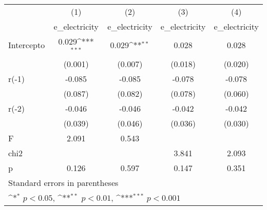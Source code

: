 {
\def\sym#1{\ifmmode^{#1}\else\(^{#1}\)\fi}
\begin{longtable}{l*{4}{c}}
\hline\hline\endfirsthead\hline\endhead\hline\endfoot\endlastfoot
            &\multicolumn{1}{c}{(1)}&\multicolumn{1}{c}{(2)}&\multicolumn{1}{c}{(3)}&\multicolumn{1}{c}{(4)}\\
            &\multicolumn{1}{c}{e\_electricity}&\multicolumn{1}{c}{e\_electricity}&\multicolumn{1}{c}{e\_electricity}&\multicolumn{1}{c}{e\_electricity}\\
\hline
Intercepto  &       0.029\sym{***}&       0.029\sym{**} &       0.028         &       0.028         \\
            &     (0.001)         &     (0.007)         &     (0.018)         &     (0.020)         \\
r(-1)       &      -0.085         &      -0.085         &      -0.078         &      -0.078         \\
            &     (0.087)         &     (0.082)         &     (0.078)         &     (0.060)         \\
r(-2)       &      -0.046         &      -0.046         &      -0.042         &      -0.042         \\
            &     (0.039)         &     (0.046)         &     (0.036)         &     (0.030)         \\
\hline
F           &       2.091         &       0.543         &                     &                     \\
chi2        &                     &                     &       3.841         &       2.093         \\
p           &       0.126         &       0.597         &       0.147         &       0.351         \\
\hline\hline
\multicolumn{5}{l}{\footnotesize Standard errors in parentheses}\\
\multicolumn{5}{l}{\footnotesize \sym{*} \(p<0.05\), \sym{**} \(p<0.01\), \sym{***} \(p<0.001\)}\\
\end{longtable}
}
